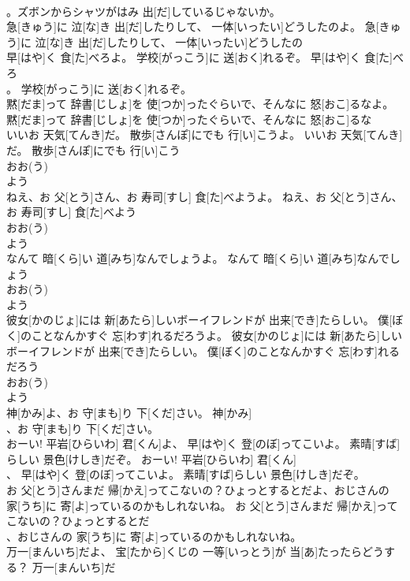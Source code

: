 \documentclass[8pt]{extreport}
\begin{document}
\begin{CJK}{UTF8}{min}
\\	。ズボンからシャツがはみ 出[だ]しているじゃないか。	
\\	急[きゅう]に 泣[な]き 出[だ]したりして、 一体[いったい]どうしたのよ。	急[きゅう]に 泣[な]き 出[だ]したりして、 一体[いったい]どうしたの
\\	早[はや]く 食[た]べろよ。 学校[がっこう]に 送[おく]れるぞ。	早[はや]く 食[た]べろ
\\	。 学校[がっこう]に 送[おく]れるぞ。	
\\	黙[だま]って 辞書[じしょ]を 使[つか]ったぐらいで、そんなに 怒[おこ]るなよ。	黙[だま]って 辞書[じしょ]を 使[つか]ったぐらいで、そんなに 怒[おこ]るな
\\	いいお 天気[てんき]だ。 散歩[さんぽ]にでも 行[い]こうよ。	いいお 天気[てんき]だ。 散歩[さんぽ]にでも 行[い]こう
\\	おお(う) 
\\	よう
\\	ねえ、お 父[とう]さん、お 寿司[すし] 食[た]べようよ。	ねえ、お 父[とう]さん、お 寿司[すし] 食[た]べよう
\\	おお(う) 
\\	よう
\\	なんて 暗[くら]い 道[みち]なんでしょうよ。	なんて 暗[くら]い 道[みち]なんでしょう
\\	おお(う) 
\\	よう
\\	彼女[かのじょ]には 新[あたら]しいボーイフレンドが 出来[でき]たらしい。 僕[ぼく]のことなんかすぐ 忘[わす]れるだろうよ。	彼女[かのじょ]には 新[あたら]しいボーイフレンドが 出来[でき]たらしい。 僕[ぼく]のことなんかすぐ 忘[わす]れるだろう
\\	おお(う) 
\\	よう
\\	神[かみ]よ、お 守[まも]り 下[くだ]さい。	神[かみ]
\\	、お 守[まも]り 下[くだ]さい。	
\\	おーい! 平岩[ひらいわ] 君[くん]よ、 早[はや]く 登[のぼ]ってこいよ。 素晴[すば]らしい 景色[けしき]だぞ。	おーい! 平岩[ひらいわ] 君[くん]
\\	、 早[はや]く 登[のぼ]ってこいよ。 素晴[すば]らしい 景色[けしき]だぞ。	
\\	お 父[とう]さんまだ 帰[かえ]ってこないの？ひょっとするとだよ、おじさんの 家[うち]に 寄[よ]っているのかもしれないね。	お 父[とう]さんまだ 帰[かえ]ってこないの？ひょっとするとだ
\\	、おじさんの 家[うち]に 寄[よ]っているのかもしれないね。	
\\	万一[まんいち]だよ、 宝[たから]くじの 一等[いっとう]が 当[あ]たったらどうする？	万一[まんいち]だ

\end{CJK}
\end{document}
